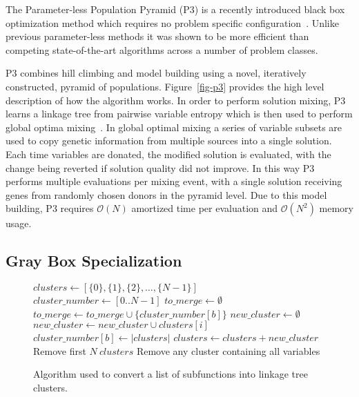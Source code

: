 \documentclass{sig-alternate}
\newcommand{\BigO}[1]{$\mathcal{O}{(#1)}$}
\begin{document}
The Parameter-less Population Pyramid (P3) is a recently introduced
black box optimization method which requires no problem specific configuration~\cite{goldman:2014:p3}.
Unlike previous parameter-less methods it was shown to be more efficient than
competing state-of-the-art algorithms across a number of problem classes.

P3 combines hill climbing and model building using a novel, iteratively constructed, pyramid
of populations. Figure~\ref{fig-p3} provides the high level description of how the algorithm
works. In order to perform solution mixing, P3 learns a linkage tree from pairwise variable
entropy which is then used to perform global optima mixing~\cite{thierens:2011:gomea}. In global
optimal mixing a series of variable subsets are used to copy genetic information from multiple
sources into a single solution. Each time variables are donated, the modified solution is evaluated,
with the change being reverted if solution quality did not improve. In this way P3 performs
multiple evaluations per mixing event, with a single solution receiving genes from randomly chosen
donors in the pyramid level.
Due to this model building, P3 requires \BigO{N} amortized time per evaluation and \BigO{N^2}
memory usage.

\subsection{Gray Box Specialization}
\begin{figure}
  \begin{algorithmic}[1]
    \State $clusters \leftarrow [\{0\}, \{1\}, \{2\}, \dots, \{N-1\}]$
    \State $cluster\_number \leftarrow [0 .. N-1]$
      \State $to\_merge \leftarrow \emptyset$
        \State $to\_merge \leftarrow to\_merge \cup \{cluster\_number[b]\}$
      \EndFor
        \State $new\_cluster \leftarrow \emptyset$
          \State $new\_cluster \leftarrow new\_cluster \cup clusters[i]$
        \EndFor
          \State $cluster\_number[b] \leftarrow |clusters|$
        \EndFor
        \State $clusters \leftarrow clusters + new\_cluster$
      \EndIf
    \EndFor
    \State Remove first $N~clusters$
    \State Remove any cluster containing all variables
  \EndProcedure
\end{algorithmic}
  \caption{Algorithm used to convert a list of subfunctions into linkage tree clusters.}
  \label{fig-sfx-tree}
\end{figure}
\end{document}
